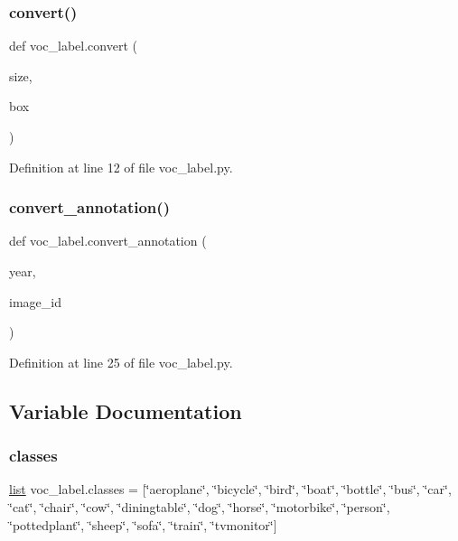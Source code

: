 \subsubsection{\texorpdfstring{convert()}{convert()}}
{\footnotesize\ttfamily def voc\+\_\+label.\+convert (\begin{DoxyParamCaption}\item[{}]{size,  }\item[{}]{box }\end{DoxyParamCaption})}



Definition at line 12 of file voc\+\_\+label.\+py.

\mbox{\label{namespacevoc__label_a88b8266c71d2efb8bcdbb3a033f210e6}} 
\subsubsection{\texorpdfstring{convert\_annotation()}{convert\_annotation()}}
{\footnotesize\ttfamily def voc\+\_\+label.\+convert\+\_\+annotation (\begin{DoxyParamCaption}\item[{}]{year,  }\item[{}]{image\+\_\+id }\end{DoxyParamCaption})}



Definition at line 25 of file voc\+\_\+label.\+py.



\subsection{Variable Documentation}
\mbox{\label{namespacevoc__label_a0dadf92eb37e0de693533dbafa6223d7}} 
\subsubsection{\texorpdfstring{classes}{classes}}
{\footnotesize\ttfamily \mbox{\hyperlink{structlist}{list}} voc\+\_\+label.\+classes = \mbox{[}\char`\"{}aeroplane\char`\"{}, \char`\"{}bicycle\char`\"{}, \char`\"{}bird\char`\"{}, \char`\"{}boat\char`\"{}, \char`\"{}bottle\char`\"{}, \char`\"{}bus\char`\"{}, \char`\"{}car\char`\"{}, \char`\"{}cat\char`\"{}, \char`\"{}chair\char`\"{}, \char`\"{}cow\char`\"{}, \char`\"{}diningtable\char`\"{}, \char`\"{}dog\char`\"{}, \char`\"{}horse\char`\"{}, \char`\"{}motorbike\char`\"{}, \char`\"{}person\char`\"{}, \char`\"{}pottedplant\char`\"{}, \char`\"{}sheep\char`\"{}, \char`\"{}sofa\char`\"{}, \char`\"{}train\char`\"{}, \char`\"{}tvmonitor\char`\"{}\mbox{]}}



